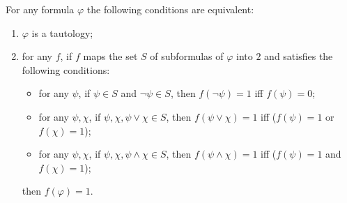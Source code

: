 For any formula $\varphi$ the following conditions are equivalent:
\begin{enumerate}
\item[(i)] $\varphi$ is a tautology;
\item[(ii)] for any $f$, if $f$ maps the set $S$ of subformulas of $\varphi$ into $2$ and satisfies the following conditions:
\begin{itemize}
\item[(a)] for any $\psi$, if $\psi \in S$ and $\neg \psi \in S$, then $f(\neg \psi) = 1$ iff $f(\psi) = 0$;
\item[(b)] for any $\psi, \chi$, if $\psi, \chi, \psi \vee \chi \in S$, then $f(\psi \vee \chi) = 1$ iff ($f(\psi) = 1$ or $f(\chi) = 1$);
\item[(c)] for any $\psi, \chi$, if $\psi, \chi, \psi \wedge \chi \in S$, then $f(\psi \wedge \chi) = 1$ iff ($f(\psi) = 1$ and $f(\chi) = 1$);
\end{itemize}
then $f(\varphi) = 1$.
\end{enumerate}
